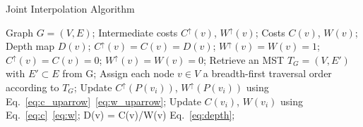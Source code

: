 \documentclass[preprint,10pt,5p,times,twocolumn]{elsarticle}
\begin{document}
\begin{algorithm}[t]
\caption{Joint Interpolation Algorithm}
\begin{algorithmic}[1]
\REQUIRE
Graph $G=(V,E)$; Intermediate costs ${C^ \uparrow }(v)$, ${W^ \uparrow }(v)$;
Costs ${C }(v)$, ${W }(v)$;
\ENSURE
Depth map $D(v)$;
\STATE  ${C^ \uparrow }(v)={C }(v)=D(v)$; ${W^ \uparrow }(v)={W }(v)=1$;
\ELSE
\STATE  ${C^ \uparrow }(v)={C }(v)=0$;  ${W^ \uparrow }(v)={W }(v)=0$;
\ENDIF
\ENDFOR
\STATE  Retrieve an MST $T_G = (V, E')$ with $E' \subset E$ from G;
\STATE Assign each node $v \in V$ a breadth-first traversal order according to $T_G$;
\label{code:if1}
\STATE Update ${C^ \uparrow }(P(v_i))$, ${W^ \uparrow }(P(v_i))$ using Eq.~\eqref{eq:c_uparrow}~\eqref{eq:w_uparrow};
\ENDIF
\ENDFOR
{}
\label{code:if2}
\STATE Update ${C}(v_i)$, ${W}(v_i)$ using Eq.~\eqref{eq:c}~\eqref{eq:w};
\ENDIF
\ENDFOR
\STATE D(v) = C(v)/W(v) Eq.~\eqref{eq:depth};
\end{algorithmic}
\label{code:alg1}
\end{algorithm}
\end{document}
